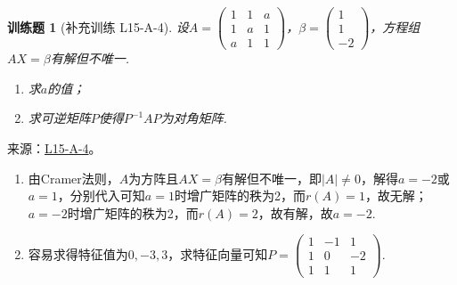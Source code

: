 \documentclass[12pt,fontset=fandol]{ctexart}
\newtheorem{exercise}{训练题}[section]
\begin{document}
\begin{exercise}[补充训练 L15-A-4]\label{prob:L15-A-4}
设$A=\begin{pmatrix}
                1 & 1 & a \\
                1 & a & 1 \\
                a & 1 & 1
            \end{pmatrix}$，$\beta=\begin{pmatrix}
                1 \\ 1 \\ -2
            \end{pmatrix}$，方程组$AX=\beta$有解但不唯一.
        \begin{enumerate}
            \item 求$a$的值；

            \item 求可逆矩阵$P$使得$P^{-1}AP$为对角矩阵.
        \end{enumerate}
\end{exercise}
\noindent 来源：\href{https://github.com/yhwu-is/Linear-Algebra-Left-Undone/blob/new/%E8%AE%B2%E4%B9%89/%E4%B8%93%E9%A2%98/15%20%E7%9B%B8%E4%BC%BC%E6%A0%87%E5%87%86%E5%BD%A2%EF%BC%9A%E5%A4%8D%E6%95%B0%E5%9F%9F%E4%B8%8A%E7%9A%84%E5%B0%9D%E8%AF%95%E4%B8%8E%E7%90%86%E8%AE%BA.tex}{L15-A-4}。
\begin{solve}
\begin{enumerate}
              \item 由Cramer法则，$A$为方阵且$AX=\beta$有解但不唯一，即$|A|\neq 0$，解得$a=-2$或$a=1$，分别代入可知$a=1$时增广矩阵的秩为2，而$r(A)=1$，故无解；$a=-2$时增广矩阵的秩为2，而$r(A)=2$，故有解，故$a=-2$.

              \item 容易求得特征值为$0,-3,3$，求特征向量可知$P=\begin{pmatrix}
                            1 & -1 & 1 \\ 1 & 0 & -2 \\ 1 & 1 & 1
                        \end{pmatrix}$.
          \end{enumerate}
\end{solve}
\end{document}
